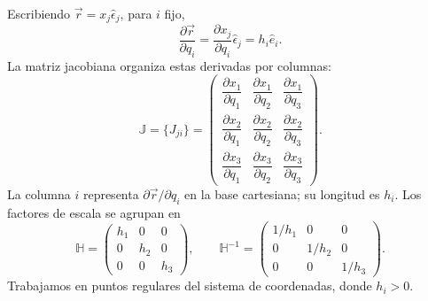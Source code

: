Escribiendo $\vec r=x_j\hat\epsilon_j$, para $i$ fijo,
\[
\frac{\partial\vec r}{\partial q_i}
=\frac{\partial x_j}{\partial q_i}\hat\epsilon_j
=h_i\hat e_i.
\]
La matriz jacobiana organiza estas derivadas por columnas:
\[
\mathbb J=\{J_{ji}\}
=\begin{pmatrix}
\dfrac{\partial x_1}{\partial q_1}&\dfrac{\partial x_1}{\partial q_2}&\dfrac{\partial x_1}{\partial q_3}\\[6pt]
\dfrac{\partial x_2}{\partial q_1}&\dfrac{\partial x_2}{\partial q_2}&\dfrac{\partial x_2}{\partial q_3}\\[6pt]
\dfrac{\partial x_3}{\partial q_1}&\dfrac{\partial x_3}{\partial q_2}&\dfrac{\partial x_3}{\partial q_3}
\end{pmatrix}.
\]
La columna $i$ representa $\partial\vec r/\partial q_i$ en la base cartesiana; su longitud es $h_i$. Los factores de escala se agrupan en
\[
\mathbb H=\begin{pmatrix}h_1&0&0\\0&h_2&0\\0&0&h_3\end{pmatrix},
\qquad
\mathbb H^{-1}=\begin{pmatrix}1/h_1&0&0\\0&1/h_2&0\\0&0&1/h_3\end{pmatrix}.
\]
Trabajamos en puntos regulares del sistema de coordenadas, donde $h_i>0$.

